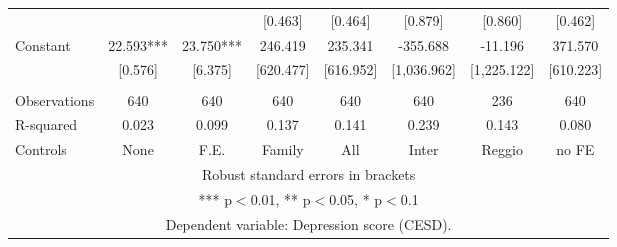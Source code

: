 \begin{tabular}{lccccccc}
 &  &  & [0.463] & [0.464] & [0.879] & [0.860] & [0.462] \\
Constant & 22.593*** & 23.750*** & 246.419 & 235.341 & -355.688 & -11.196 & 371.570 \\
 & [0.576] & [6.375] & [620.477] & [616.952] & [1,036.962] & [1,225.122] & [610.223] \\
 &  &  &  &  &  &  &  \\
Observations & 640 & 640 & 640 & 640 & 640 & 236 & 640 \\
R-squared & 0.023 & 0.099 & 0.137 & 0.141 & 0.239 & 0.143 & 0.080 \\
 Controls & None & F.E. & Family & All & Inter & Reggio & no FE \\ \hline
\multicolumn{8}{c}{ Robust standard errors in brackets} \\
\multicolumn{8}{c}{ *** p$<$0.01, ** p$<$0.05, * p$<$0.1} \\
\multicolumn{8}{c}{ Dependent variable: Depression score (CESD).} \\
\end{tabular}
